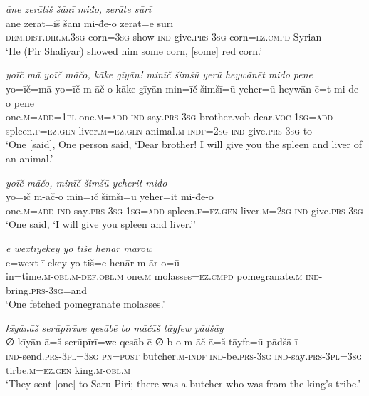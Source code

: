 \ea \label{ŽP.215}
\textit{āne zerātiš šānī miđo, zerāte sūrī} \\ 
\gll āne zerāt=iš šānī mi-đe-o zerāt=e sūrī \\ 
 \textsc{dem.dist}\textsc{.dir}\textsc{.m}\textsc{.3sg} corn\textsc{=3sg} show \textsc{ind-}give\textsc{.prs}\textsc{-3sg} corn\textsc{=ez}\textsc{.cmpd} Syrian \\ 
\glt `He (Pir Shaliyar) showed him some corn, [some] red corn.'
\z 
 
\ea \label{ŽP.230}
\textit{yoīč mā yoīč māčo, kāke gīyān! minīč šimšū yerū heywānēt mido pene} \\ 
\gll yo=īč=mā yo=īč m-āč-o kāke gīyān min=īč šimšī=ū yeher=ū heywān-ē=t mi-de-o pene \\ 
 one\textsc{.m}\textsc{=add}\textsc{=1pl} one\textsc{.m}\textsc{=add} \textsc{ind-}say\textsc{.prs}\textsc{-3sg} brother.vob dear.\textsc{voc} \textsc{1sg}\textsc{=add} spleen\textsc{.f}\textsc{\textsc{=ez.gen}} liver\textsc{.m}\textsc{\textsc{=ez.gen}} animal\textsc{.m}\textsc{-indf}\textsc{=\textsc{2sg}} \textsc{ind-}give\textsc{.prs}\textsc{-3sg} to \\ 
\glt `One [said], One person said, ‘Dear brother! I will give you the spleen and liver of an animal.'
\z 
 
\ea \label{ŽP.238}
\textit{yoīč māčo, minīč šimšū yeherit miđo} \\ 
\gll yo=īč m-āč-o min=īč šimšī=ū yeher=it mi-đe-o \\ 
 one\textsc{.m}\textsc{=add} \textsc{ind-}say\textsc{.prs}\textsc{-3sg} \textsc{1sg}\textsc{=add} spleen\textsc{.f}\textsc{\textsc{=ez.gen}} liver\textsc{.m}\textsc{=\textsc{2sg}} \textsc{ind-}give\textsc{.prs}\textsc{-3sg} \\ 
\glt `One said, ‘I will give you spleen and liver.’'
\z 
 
\ea \label{ŽP.249}
\textit{e wextīyekey yo tiše henār mārow} \\ 
\gll e=wext-ī-ekey yo tiš=e henār m-ār-o=ū \\ 
 in=time\textsc{.m}\textsc{-obl}\textsc{.m}\textsc{-def}\textsc{.obl}\textsc{.m} one\textsc{.m} molasses\textsc{=ez}\textsc{.cmpd} pomegranate\textsc{.m} \textsc{ind-}bring\textsc{.prs}\textsc{-3sg}=and \\ 
\glt `One fetched pomegranate molasses.'
\z 
 
\ea \label{ŽP.251}
\textit{kīyānāš serūpīrīwe qesābē bo māčāš tāyfew pādšāy} \\ 
\gll ∅-kīyān-ā=š serūpīrī=we qesāb-ē ∅-b-o m-āč-ā=š tāyfe=ū pādšā-ī \\ 
 \textsc{ind-}send\textsc{.prs}\textsc{-3pl}\textsc{=3sg} \textsc{pn}\textsc{=\textsc{post}} butcher\textsc{.m}\textsc{-indf} \textsc{ind-}be\textsc{.prs}\textsc{-3sg} \textsc{ind-}say\textsc{.prs}\textsc{-3pl}\textsc{=3sg} tirbe\textsc{.m}\textsc{\textsc{=ez.gen}} king\textsc{.m}\textsc{-obl}\textsc{.m} \\ 
\glt `They sent [one] to Saru Piri; there was a butcher who was from the king’s tribe.'
\z 
 
